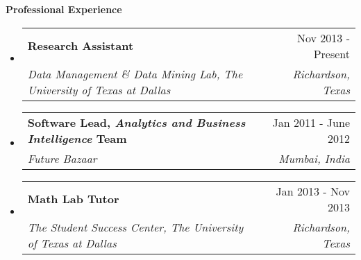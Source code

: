 \documentclass[letterpaper,11pt]{article}
\makeatletter
\newcommand{\resitem}[1]{\item[\ding{226}] #1 \vspace{-2pt}}
\newcommand{\resheading}[1]{{\large \colorbox{mygrey}{\begin{minipage}{\textwidth}{\textbf{#1 \vphantom{p\^{E}}}}\end{minipage}}}}
\newcommand{\ressubheading}[4]{
\begin{tabular*}{7.0in}{l@{\extracolsep{\fill}}r}
		\textbf{#1} & #2 \\
		\textit{#3} & \textit{#4} \\
\end{tabular*}\vspace{-6pt}}
\newcommand{\reslineheading}[2]{
\begin{tabular*}{7.0in}{l@{\extracolsep{\fill}}r}
		\textbf{#1} & #2 \\
\end{tabular*}\vspace{-6pt}}
\makeatother
\begin{document}
\begin{itemize}

%
%

\end{itemize}

\resheading{Professional Experience}
\begin{itemize}
\item
	\ressubheading{Research Assistant}{Nov 2013 - Present}{Data Management \& Data Mining Lab, The University of Texas at Dallas}{Richardson, Texas}

\item
	\ressubheading{Software Lead, \textit{Analytics and Business Intelligence} Team}{Jan 2011 - June 2012}{Future Bazaar}{Mumbai, India}

\item
	\ressubheading{Math Lab Tutor}{Jan 2013 - Nov 2013}{The Student Success Center, The University of Texas at Dallas}{Richardson, Texas} 

\end{itemize}
\end{document}
